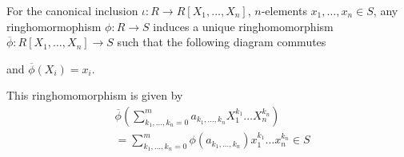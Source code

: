 \begin{thm}
  For the canonical inclusion $\iota: R \to R[X_1,\ldots,X_n]$, $n$-elements $x_1,\ldots,x_n \in S$, any ringhomormophism $\phi: R \to  S$ induces a unique ringhomomorphism $\overline{\phi}: R[X_1,\ldots,X_n] \to S$ such that the following diagram commutes
  \begin{center}
  \end{center}
  and $\overline{\phi}(X_i) = x_i$.

\end{thm}
This ringhomomorphism is given by
\begin{align*}
  &\overline{\phi}\left(
    \sum_{k_1,\ldots,k_n = 0}^{m}a_{k_1,\ldots,k_n}X_1^{k_1} \dots X_n^{k_n}
  \right)\\
  &=\sum_{k_1,\ldots,k_n = 0}^{m}
  \phi(a_{k_1,\ldots,k_n}) x_1^{k_1}\dots x_n^{k_n} \in S
\end{align*}


